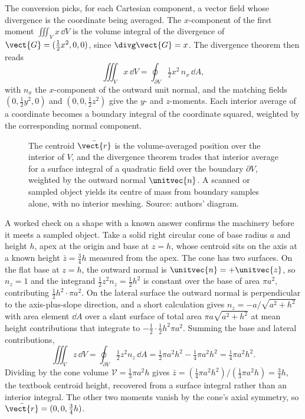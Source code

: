 The conversion picks, for each Cartesian component, a vector field whose
divergence is the coordinate being averaged. The $x$-component of the
first moment $\iiint_{V}x\,\dd V$ is the volume integral of the
divergence of $\vect{G} = (\tfrac{1}{2}x^{2}, 0, 0)$, since
$\divg\vect{G} = x$. The divergence theorem then reads
\[
\iiint_{V}x\,\dd V = \oint_{\partial V}\tfrac{1}{2}x^{2}\,n_{x}\,\dd A,
\]
with $n_{x}$ the $x$-component of the outward unit normal, and the
matching fields $(0, \tfrac{1}{2}y^{2}, 0)$ and $(0, 0, \tfrac{1}{2}
z^{2})$ give the $y$- and $z$-moments. Each interior average of a
coordinate becomes a boundary integral of the coordinate squared,
weighted by the corresponding normal component.

\begin{figure}[h]
  \centering
  
  \caption[Centroid of a region from a boundary integral.]{The centroid
  $\bar{\vect{r}}$ is the volume-averaged position over the interior of
  $V$, and the divergence theorem trades that interior average for a
  surface integral of a quadratic field over the boundary $\partial V$,
  weighted by the outward normal $\unitvec{n}$. A scanned or sampled
  object yields its centre of mass from boundary samples alone, with no
  interior meshing. Source: authors' diagram.}
  \label{fig:vol02ch08:centroid-surface}
\end{figure}

A worked check on a shape with a known answer confirms the machinery
before it meets a sampled object. Take a solid right circular cone of
base radius $a$ and height $h$, apex at the origin and base at $z = h$,
whose centroid sits on the axis at a known height $\bar{z} = \tfrac{3}{4}
h$ measured from the apex. The cone has two surfaces. On the flat base
at $z = h$, the outward normal is $\unitvec{n} = +\unitvec{z}$, so
$n_{z} = 1$ and the integrand $\tfrac{1}{2}z^{2}n_{z} = \tfrac{1}{2}
h^{2}$ is constant over the base of area $\pi a^{2}$, contributing
$\tfrac{1}{2}h^{2}\cdot\pi a^{2}$. On the lateral surface the outward
normal is perpendicular to the axis-plus-slope direction, and a short
calculation gives $n_{z} = -a/\sqrt{a^{2} + h^{2}}$ with area element
$\dd A$ over a slant surface of total area $\pi a\sqrt{a^{2} + h^{2}}$
at mean height contributions that integrate to $-\tfrac{1}{2}\cdot
\tfrac{1}{2}h^{2}\pi a^{2}$. Summing the base and lateral contributions,
\[
\iiint_{V}z\,\dd V = \oint_{\partial V}\tfrac{1}{2}z^{2}n_{z}\,\dd A =
\tfrac{1}{2}\pi a^{2}h^{2} - \tfrac{1}{4}\pi a^{2}h^{2} =
\tfrac{1}{4}\pi a^{2}h^{2}.
\]
Dividing by the cone volume $\mathcal{V} = \tfrac{1}{3}\pi a^{2}h$ gives
$\bar{z} = (\tfrac{1}{4}\pi a^{2}h^{2})/(\tfrac{1}{3}\pi a^{2}h) =
\tfrac{3}{4}h$, the textbook centroid height, recovered from a surface
integral rather than an interior integral. The other two moments
vanish by the cone's axial symmetry, so $\bar{\vect{r}} = (0, 0,
\tfrac{3}{4}h)$.

